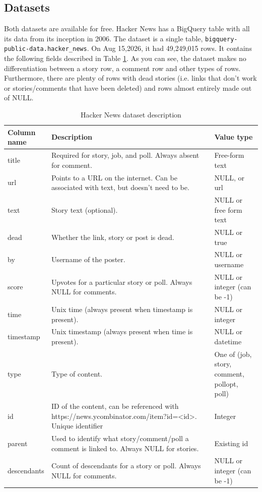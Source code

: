 \documentclass[nonacm,sigconf]{acmart}
\begin{document}
\subsection{Datasets}

Both datasets are available for free. Hacker News has a BigQuery table with all its data from its inception in 2006. The dataset is a single table, \texttt{bigquery-public-data.hacker\_news}. On Aug 15,2026, it had 49,249,015 rows. It contains the following fields described in Table \ref{tab:hackernews}. As you can see, the dataset makes no differentiation between a story row, a comment row and other types of rows. Furthermore, there are plenty of rows with dead stories (i.e. links that don't work or stories/comments that have been deleted) and rows almost entirely made out of NULL.

\begin{table}[htbp]
    \begin{tabular}{p{0.1\linewidth}|p{0.7\linewidth}|p{0.2\linewidth}}
         Column name & Description & Value type  \\
         \hline
         title & Required for story, job, and poll. Always absent for comment. & Free-form text \\ 
         url & Points to a URL on the internet. Can be associated with text, but doesn't need to be. & NULL, or url \\
         text & Story text (optional). & NULL or free form text \\
         dead & Whether the link, story or post is dead. & NULL or true \\
         by & Username of the poster. & NULL or username \\
         score & Upvotes for a particular story or poll. Always NULL for comments. & NULL or integer (can be -1) \\
         time & Unix time (always present when timestamp is present). & NULL or integer \\
         timestamp & Unix timestamp (always present when time is present). & NULL or datetime \\
         type & Type of content. & One of (job, story, comment, pollopt, poll) \\
         id & ID of the content, can be referenced with https://news.ycombinator.com/item?id=<id>. Unique identifier & Integer \\
         parent & Used to identify what story/comment/poll a comment is linked to. Always NULL for stories. & Existing id \\
         descendants & Count of descendants for a story or poll. Always NULL for comments. & NULL or integer (can be -1) \\
    \end{tabular}
    \caption{Hacker News dataset description}
    \label{tab:hackernews}
\end{table}
\end{document}

